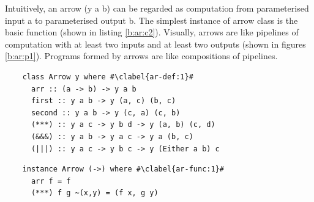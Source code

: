 Intuitively, an arrow (y a b) can be regarded as computation from parameterised input a to parameterised output b. The simplest instance of arrow class is the basic function (shown in listing \ref{b:ar:c2}). Visually, arrows are like pipelines of computation with at least two inputs and at least two outputs (shown in figures \ref{b:ar:p1}\cite{HaskellUnderstandingArrows}). Programs formed by arrows are like compositions of pipelines.
\begin{code}
  \begin{verbatim}
    class Arrow y where #\clabel{ar-def:1}#
      arr :: (a -> b) -> y a b
      first :: y a b -> y (a, c) (b, c)
      second :: y a b -> y (c, a) (c, b)
      (***) :: y a c -> y b d -> y (a, b) (c, d)
      (&&&) :: y a b -> y a c -> y a (b, c)
      (|||) :: y a c -> y b c -> y (Either a b) c  
  \end{verbatim}
  \label{b:ar:c1}
\end{code}
\begin{code}
  \begin{verbatim}
    instance Arrow (->) where #\clabel{ar-func:1}#
      arr f = f
      (***) f g ~(x,y) = (f x, g y)
  \end{verbatim}
  \label{b:ar:c2}
\end{code}
